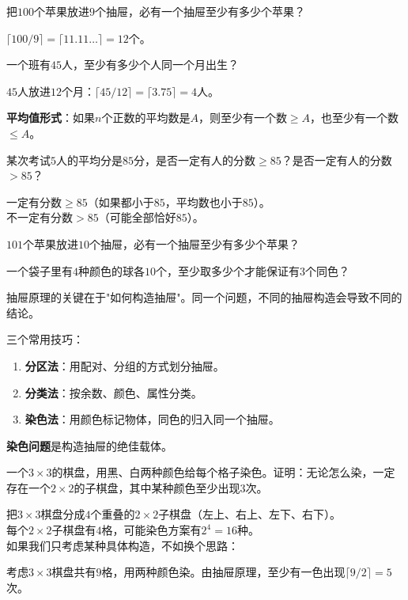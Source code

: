 \begin{example}
把$100$个苹果放进$9$个抽屉，必有一个抽屉至少有多少个苹果？
\end{example}
\begin{solution}
$\lceil 100/9\rceil = \lceil 11.11\ldots\rceil = 12$个。
\end{solution}

\begin{example}
一个班有$45$人，至少有多少个人同一个月出生？
\end{example}
\begin{solution}
$45$人放进$12$个月：$\lceil 45/12\rceil = \lceil 3.75\rceil = 4$人。
\end{solution}

\textbf{平均值形式}：如果$n$个正数的平均数是$A$，则至少有一个数$\ge A$，也至少有一个数$\le A$。

\begin{example}
某次考试$5$人的平均分是$85$分，是否一定有人的分数$\ge85$？是否一定有人的分数$>85$？
\end{example}
\begin{solution}
一定有分数$\ge85$（如果都小于$85$，平均数也小于$85$）。\\
不一定有分数$>85$（可能全部恰好$85$）。
\end{solution}

\begin{exercise}
\item $101$个苹果放进$10$个抽屉，必有一个抽屉至少有多少个苹果？
\item 一个袋子里有$4$种颜色的球各$10$个，至少取多少个才能保证有$3$个同色？
\end{exercise}


抽屉原理的关键在于"如何构造抽屉"。同一个问题，不同的抽屉构造会导致不同的结论。

三个常用技巧：
\begin{enumerate}
\item \textbf{分区法}：用配对、分组的方式划分抽屉。
\item \textbf{分类法}：按余数、颜色、属性分类。
\item \textbf{染色法}：用颜色标记物体，同色的归入同一个抽屉。
\end{enumerate}

\textbf{染色问题}是构造抽屉的绝佳载体。

\begin{example}
一个$3\times3$的棋盘，用黑、白两种颜色给每个格子染色。证明：无论怎么染，一定存在一个$2\times2$的子棋盘，其中某种颜色至少出现$3$次。
\end{example}
\begin{solution}
把$3\times3$棋盘分成$4$个重叠的$2\times2$子棋盘（左上、右上、左下、右下）。\\
每个$2\times2$子棋盘有$4$格，可能染色方案有$2^4=16$种。\\
如果我们只考虑某种具体构造，不如换个思路：

考虑$3\times3$棋盘共有$9$格，用两种颜色染。由抽屉原理，至少有一色出现$\lceil9/2\rceil=5$次。
\end{solution}

